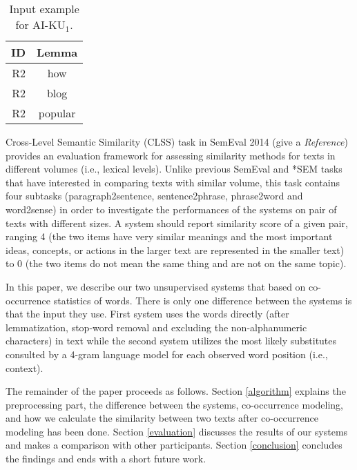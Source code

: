 \documentclass[11pt]{article}
\begin{document}
\begin{table}
\begin{center}
\begin{tabular}{|r|c|}
\hline \bf ID & \bf Lemma \\ \hline
R2 & how \\
R2 & blog \\
R2 & popular \\
\hline
\end{tabular}
\end{center}
\caption{\label{tab:system1_input} Input example for AI-KU$_1$.}
\end{table}

Cross-Level Semantic Similarity (CLSS) task in SemEval 2014 (give a \emph{Reference}) provides an evaluation framework for assessing similarity methods for texts in different volumes (i.e., lexical levels). Unlike previous SemEval and *SEM tasks that have interested in comparing texts with similar volume, this task contains four subtasks (paragraph2sentence, sentence2phrase, phrase2word and word2sense) in order to investigate the performances of the systems on pair of texts with different sizes. A system should report similarity score of a given pair, ranging 4 (the two items have very similar meanings and the most important ideas, concepts, or actions in the larger text are represented in the smaller text) to 0 (the two items do not mean the same thing and are not on the same topic).

In this paper, we describe our two unsupervised systems that based on co-occurrence statistics of words. There is only one difference between the systems is that the input they use. First system uses the words directly (after lemmatization, stop-word removal and excluding the non-alphanumeric characters) in text while the second system utilizes the most likely substitutes consulted by a 4-gram language model for each observed word position (i.e., context). 


The remainder of the paper proceeds as follows. Section \ref{algorithm} explains the preprocessing part, the difference between the systems, co-occurrence modeling, and how we calculate the similarity between two texts after co-occurrence modeling has been done. Section \ref{evaluation} discusses the results of our systems and makes a comparison with other participants. Section \ref{conclusion} concludes the findings and ends with a short future work.
\end{document}
